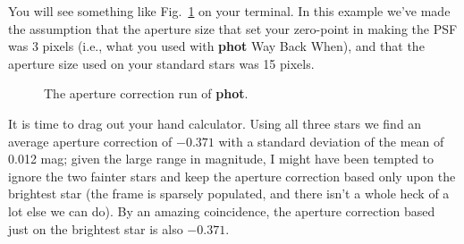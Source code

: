\noindent
You will see something like Fig.~\ref{apcor1} on your terminal.
In this example we've made the assumption that the aperture size that
set your zero-point in making the PSF was 3 pixels (i.e., what you used
with {\bf phot} Way Back When), and that the aperture size used on your
standard stars was 15 pixels.
\begin{figure}
\vspace{3.0in}
\caption{\label{apcor1} The aperture correction run of {\bf phot}.}
\end{figure}
It is time to drag out your hand calculator.  Using all three stars we
find an average aperture correction of $-0.371$ with a standard
deviation of the mean of 0.012 mag; given the large range in magnitude,
I might have been tempted to ignore the two fainter stars and keep the
aperture correction based only upon the brightest star (the frame is
sparsely populated, and there isn't a whole heck of a lot else we can
do).  By an amazing coincidence, the aperture correction based just on
the brightest star is also $-0.371$.
 
 
